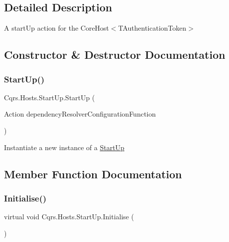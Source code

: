 \subsection{Detailed Description}
A start\+Up action for the Core\+Host$<$\+T\+Authentication\+Token$>$ 



\subsection{Constructor \& Destructor Documentation}
\mbox{\label{classCqrs_1_1Hosts_1_1StartUp_a5f8292bb6d614027f7d7a8ce95aebc46_a5f8292bb6d614027f7d7a8ce95aebc46}} 
\subsubsection{\texorpdfstring{Start\+Up()}{StartUp()}}
{\footnotesize\ttfamily Cqrs.\+Hosts.\+Start\+Up.\+Start\+Up (\begin{DoxyParamCaption}\item[{Action}]{dependency\+Resolver\+Configuration\+Function }\end{DoxyParamCaption})}



Instantiate a new instance of a \hyperlink{classCqrs_1_1Hosts_1_1StartUp}{Start\+Up} 



\subsection{Member Function Documentation}
\mbox{\label{classCqrs_1_1Hosts_1_1StartUp_ab2446f15d55a08163a2b158bb34c3fe2_ab2446f15d55a08163a2b158bb34c3fe2}} 
\subsubsection{\texorpdfstring{Initialise()}{Initialise()}}
{\footnotesize\ttfamily virtual void Cqrs.\+Hosts.\+Start\+Up.\+Initialise (\begin{DoxyParamCaption}{ }\end{DoxyParamCaption})\hspace{0.3cm}{\ttfamily [virtual]}}



